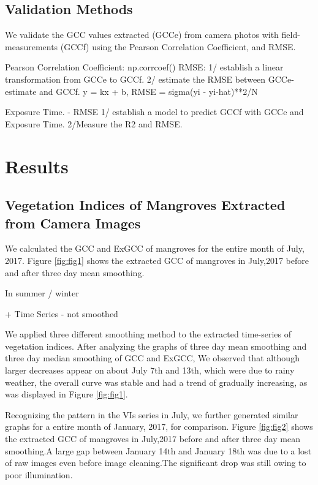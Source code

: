 \documentclass{article}
\begin{document}
\subsection{Validation Methods}
We validate the GCC values extracted (GCCe) from camera photos with field-measurements (GCCf) using the Pearson Correlation Coefficient, and RMSE.    

Pearson Correlation Coefficient: np.corrcoef()
RMSE: 1/ establish a linear transformation from GCCe to GCCf. 2/ estimate the RMSE between GCCe-estimate and GCCf. y = kx + b, RMSE = sigma(yi - yi-hat)**2/N

Exposure Time.  - RMSE 1/ establish a model to predict GCCf with GCCe and Exposure Time. 2/Measure the R2 and RMSE. 


\subsubsection{}



\section{Results} 





\subsection{Vegetation Indices of Mangroves Extracted from Camera Images}
We calculated the GCC and ExGCC of mangroves for the entire month of July, 2017. Figure \ref{fig:fig1} shows the extracted GCC of mangroves in July,2017 before and after three day mean smoothing.

In summer / winter 

+ Time Series - not smoothed 

We applied three different smoothing method to the extracted time-series of vegetation indices. After analyzing the graphs of three day mean smoothing and three day median smoothing of GCC and ExGCC, We observed that although larger decreases appear on about July 7th and 13th, which were due to rainy weather, the overall curve was stable and had a trend of gradually increasing, as was displayed in Figure \ref{fig:fig1}.


Recognizing the pattern in the VIs series in July, we further generated similar graphs for a entire month of January, 2017, for comparison.
Figure \ref{fig:fig2} shows the extracted GCC of mangroves in July,2017 before and after three day mean smoothing.A large gap between January 14th and January 18th was due to a lost of raw images even before image cleaning.The significant drop was still owing to poor illumination.
\end{document}
